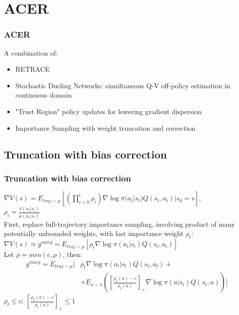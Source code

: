 \documentclass{beamer}
\begin{document}
\section{ACER}

\begin{frame}
\frametitle{ACER}
A combination of:
\begin{itemize}
\item RETRACE
\item Stochastic Dueling Networks: simultaneous Q-V off-policy estimation in continuous domain
\item "Trust Region" policy updates for lowering gradient dispersion
\item Importance Sampling with weight truncation and correction
\end{itemize}
\end{frame}

\subsection{Truncation with bias correction}

\begin{frame}
\frametitle{Truncation with bias correction}
 $\nabla V(s) = E_{traj \sim \mu } \left[ \left( \prod_{i=0}^t \rho_i \right) \nabla \log \pi (a_t|s_t) Q(s_t, a_t) | s_0 = s \right]$,\\
 $\rho_i = \frac{\pi(a_i|s_i)}{\mu(a_i|s_i)}$\\
 First, replace full-trajectory importance sampling, involving product of many potentially unbounded weights, with last importance weight $\rho_t$:\\
  $\nabla V(s) \simeq g^{marg} = E_{traj \sim \mu } \left[  \rho_t \nabla \log \pi (a_t|s_t) Q(s_t, a_t) \right]$\\
  
 \vspace{3mm}
Let $\overline{\rho} = min(c, \rho)$, then:
\begin{align*}
g^{marg} = E_{traj \sim \mu } \big[ & \overline{\rho_t} \nabla \log \pi (a_t|s_t) Q(s_t, a_t) + \\
& + E_{a \sim \pi} \left( \left[\frac{\rho_t(a) - c}{\rho_t(a)}\right]_+ \nabla \log \pi (a|s_t) Q(s_t, a) \right) \big]
\end{align*}
\vspace{3mm}
$\overline{\rho_t}  \leq c$; $\left[\frac{\rho_t(a) - c}{\rho_t(a)}\right]_+ \leq 1$
\end{frame}
\end{document}
